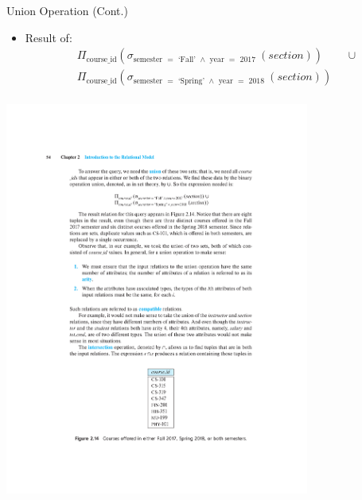 \documentclass{beamer}
\begin{document}
\begin{frame}{Union Operation (Cont.)}
    \begin{itemize}
        \item Result of:
        \begin{equation*}
            \begin{split}
                \Pi_{\text{course\_id}} (\sigma_{ \text{semester } = \text{ `Fall' } \wedge \text{ year } = \text{ 2017 } } (section) ) & \text{ } \cup \\
                \Pi_{\text{course\_id}} (\sigma_{ \text{semester } = \text{ `Spring' } \wedge \text{ year } = \text{ 2018 } } (section) ) & \\
            \end{split}
        \end{equation*}
    \end{itemize}
    \centering
    \includegraphics[width=0.75\textwidth, trim={6.35cm 4.50cm 6.00cm 18.95cm}, clip]{figures/db_union}
\end{frame}
\end{document}
